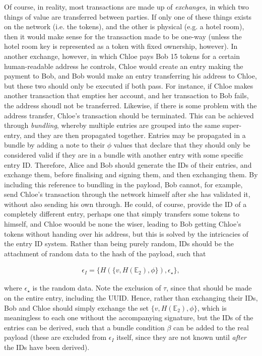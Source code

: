 \documentclass{extreport}
\begin{document}
Of course, in reality, most transactions are made up of \emph{exchanges}, in which two things of value are transferred between parties. If only one of these things exists on the network (i.e. the tokens), and the other is physical (e.g. a hotel room), then it would make sense for the transaction made to be one-way (unless the hotel room key is represented as a token with fixed ownership, however). In another exchange, however, in which Chloe pays Bob 15 tokens for a certain human-readable address he controls, Chloe would create an entry making the payment to Bob, and Bob would make an entry transferring his address to Chloe, but these two should only be executed if both pass. For instance, if Chloe makes another transaction that empties her account, and her transaction to Bob fails, the address shoudl not be transferred. Likewise, if there is some problem with the address transfer, Chloe's transaction should be terminated. This can be achieved through \emph{bundling}, whereby multiple entries are grouped into the same super-entry, and they are then propagated together. Entries may be propagated in a bundle by adding a note to their \(\phi\) values that declare that they should only be considered valid if they are in a bundle with another entry with some specific entry ID. Therefore, Alice and Bob should generate the IDs of their entries, and exchange them, before finalising and signing them, and then exchanging them. By including this reference to bundling in the payload, Bob cannot, for example, send Chloe's transaction through the network himself after she has validated it, without also sending his own through. He could, of course, provide the ID of a completely different entry, perhaps one that simply transfers some tokens to himself, and Chloe woould be none the wiser, leading to Bob getting Chloe's tokens without handing over his address, but this is solved by the intricacies of the entry ID system. Rather than being purely random, IDs should be the attachment of random data to the hash of the payload, such that

\begin{align*}
\epsilon_I = \{ H(\{  v, H(\mathbb{E}_2), \phi \}), \epsilon_\star \}, \tag{10.1}
\end{align*}

where \(\epsilon_\star\) is the random data. Note the exclusion of \(\tau\), since that should be made on the entire entry, including the UUID. Hence, rather than exchanging their IDs, Bob and Chloe should simply exchange the set \(\{ v, H(\mathbb{E}_2), \phi \}\), which is meaningless to each one without the accompanying signature, but the IDs of the entries can be derived, such that a bundle condition \(\beta\) can be added to the real payload (these are excluded from \(\epsilon_I\) itself, since they are not known until \emph{after} the IDs have been derived).
\end{document}

